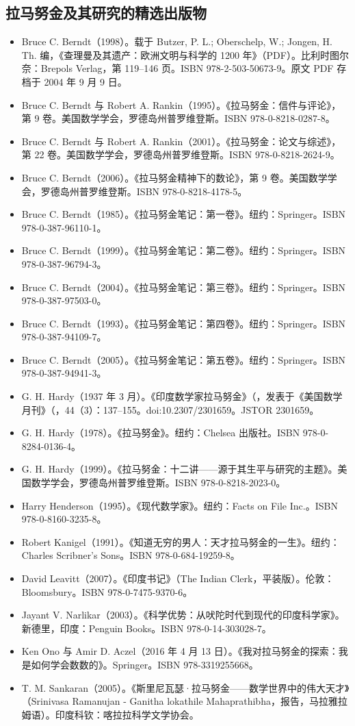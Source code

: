 \subsection{拉马努金及其研究的精选出版物}
\begin{itemize}
\item Bruce C. Berndt（1998）。载于 Butzer, P. L.; Oberschelp, W.; Jongen, H. Th. 编，《查理曼及其遗产：欧洲文明与科学的 1200 年》（PDF）。比利时图尔奈：Brepols Verlag，第 119–146 页。ISBN 978-2-503-50673-9。原文 PDF 存档于 2004 年 9 月 9 日。
\item Bruce C. Berndt 与 Robert A. Rankin（1995）。《拉马努金：信件与评论》，第 9 卷。美国数学学会，罗德岛州普罗维登斯。ISBN 978-0-8218-0287-8。
\item Bruce C. Berndt 与 Robert A. Rankin（2001）。《拉马努金：论文与综述》，第 22 卷。美国数学学会，罗德岛州普罗维登斯。ISBN 978-0-8218-2624-9。
\item Bruce C. Berndt（2006）。《拉马努金精神下的数论》，第 9 卷。美国数学学会，罗德岛州普罗维登斯。ISBN 978-0-8218-4178-5。
\item Bruce C. Berndt（1985）。《拉马努金笔记：第一卷》。纽约：Springer。ISBN 978-0-387-96110-1。
\item Bruce C. Berndt（1999）。《拉马努金笔记：第二卷》。纽约：Springer。ISBN 978-0-387-96794-3。
\item Bruce C. Berndt（2004）。《拉马努金笔记：第三卷》。纽约：Springer。ISBN 978-0-387-97503-0。
\item Bruce C. Berndt（1993）。《拉马努金笔记：第四卷》。纽约：Springer。ISBN 978-0-387-94109-7。
\item Bruce C. Berndt（2005）。《拉马努金笔记：第五卷》。纽约：Springer。ISBN 978-0-387-94941-3。
\item G. H. Hardy（1937 年 3 月）。《印度数学家拉马努金》（，发表于《美国数学月刊》（，44（3）：137–155。doi:10.2307/2301659。JSTOR 2301659。
\item G. H. Hardy（1978）。《拉马努金》。纽约：Chelsea 出版社。ISBN 978-0-8284-0136-4。
\item G. H. Hardy（1999）。《拉马努金：十二讲——源于其生平与研究的主题》。美国数学学会，罗德岛州普罗维登斯。ISBN 978-0-8218-2023-0。
\item Harry Henderson（1995）。《现代数学家》。纽约：Facts on File Inc.。ISBN 978-0-8160-3235-8。
\item Robert Kanigel（1991）。《知道无穷的男人：天才拉马努金的一生》。纽约：Charles Scribner's Sons。ISBN 978-0-684-19259-8。
\item David Leavitt（2007）。《印度书记》（The Indian Clerk，平装版）。伦敦：Bloomsbury。ISBN 978-0-7475-9370-6。
\item Jayant V. Narlikar（2003）。《科学优势：从吠陀时代到现代的印度科学家》。新德里，印度：Penguin Books。ISBN 978-0-14-303028-7。
\item Ken Ono 与 Amir D. Aczel（2016 年 4 月 13 日）。《我对拉马努金的探索：我是如何学会数数的》。Springer。ISBN 978-3319255668。
\item T. M. Sankaran（2005）。《斯里尼瓦瑟·拉马努金——数学世界中的伟大天才》（Srinivasa Ramanujan - Ganitha lokathile Mahaprathibha，报告，马拉雅拉姆语）。印度科钦：喀拉拉科学文学协会。
\end{itemize}
